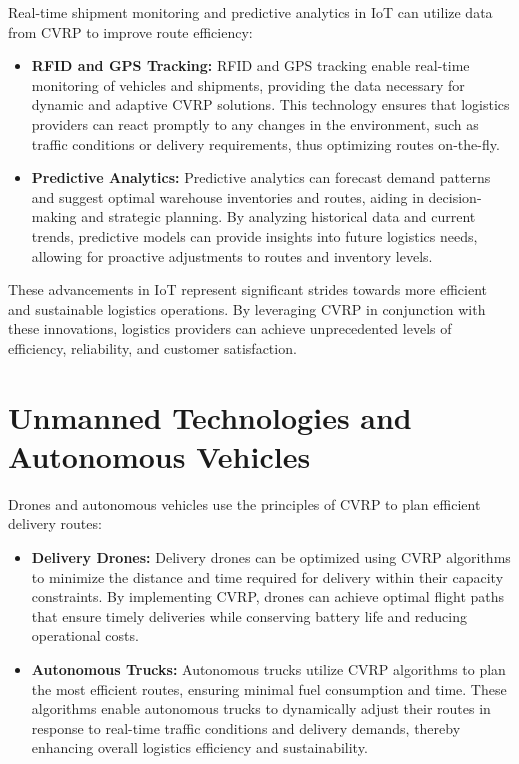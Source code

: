 \documentclass[
]{article}
\begin{document}
Real-time shipment monitoring and predictive analytics in IoT can utilize data from CVRP to improve route efficiency:

\begin{itemize}
    \item \textbf{RFID and GPS Tracking:} RFID and GPS tracking enable real-time monitoring of vehicles and shipments, providing the data necessary for dynamic and adaptive CVRP solutions. This technology ensures that logistics providers can react promptly to any changes in the environment, such as traffic conditions or delivery requirements, thus optimizing routes on-the-fly.
    \item \textbf{Predictive Analytics:} Predictive analytics can forecast demand patterns and suggest optimal warehouse inventories and routes, aiding in decision-making and strategic planning. By analyzing historical data and current trends, predictive models can provide insights into future logistics needs, allowing for proactive adjustments to routes and inventory levels.
\end{itemize}

These advancements in IoT represent significant strides towards more efficient and sustainable logistics operations. By leveraging CVRP in conjunction with these innovations, logistics providers can achieve unprecedented levels of efficiency, reliability, and customer satisfaction.

\section{Unmanned Technologies and Autonomous Vehicles}

Drones and autonomous vehicles use the principles of CVRP to plan efficient delivery routes:

\begin{itemize}
    \item \textbf{Delivery Drones:} Delivery drones can be optimized using CVRP algorithms to minimize the distance and time required for delivery within their capacity constraints. By implementing CVRP, drones can achieve optimal flight paths that ensure timely deliveries while conserving battery life and reducing operational costs.
    \item \textbf{Autonomous Trucks:} Autonomous trucks utilize CVRP algorithms to plan the most efficient routes, ensuring minimal fuel consumption and time. These algorithms enable autonomous trucks to dynamically adjust their routes in response to real-time traffic conditions and delivery demands, thereby enhancing overall logistics efficiency and sustainability.
\end{itemize}
\end{document}
